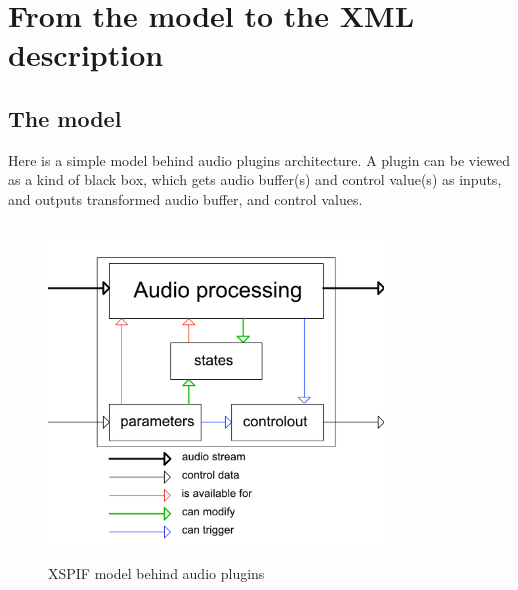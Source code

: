 
\chapter{From the model to the XML description}


\section{The model}

\noindent Here is a simple model behind audio plugins architecture. A
plugin can be viewed as a kind of black box, which gets audio buffer(s)
and control value(s) as inputs, and outputs transformed audio buffer,
and control values. 

\begin{figure}[htb]
\begin{center}
\includegraphics[height=3.5in,width=3.5in]{pluginmodel}
\caption{XSPIF model behind audio plugins}\label{xspifpluginmodel}
\end{center}
\end{figure}


